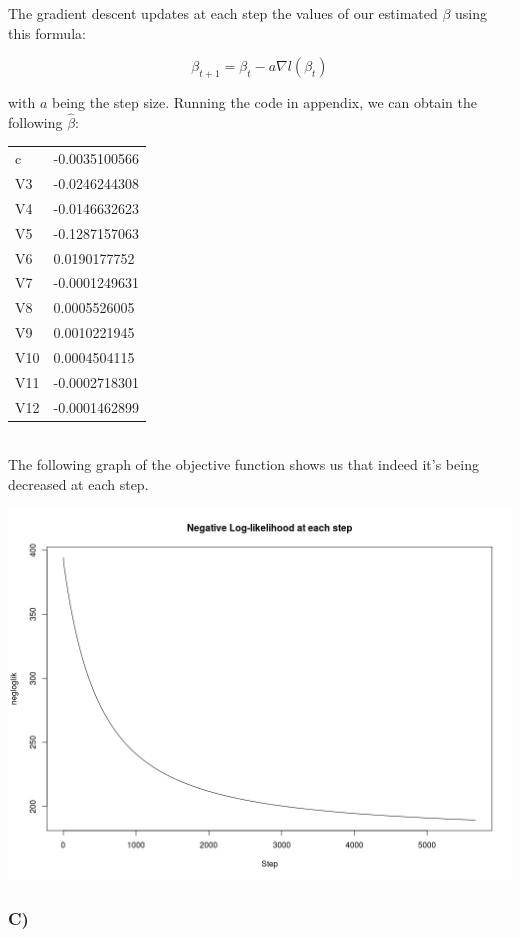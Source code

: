 \documentclass{article}
\begin{document}
The gradient descent updates at each step the values of our estimated $\beta$ using this formula:

\begin{equation*}
\beta_{t+1}=\beta_t-a\nabla l(\beta_t)
\end{equation*}

with $a$ being the step size. Running the code in appendix, we can obtain the following $\hat{\beta}$:\\

\begin{tabular}{ll}
c		    &-0.0035100566\\
V3          &-0.0246244308\\
V4          &-0.0146632623\\
V5          &-0.1287157063\\
V6          & 0.0190177752\\
V7          &-0.0001249631\\
V8          & 0.0005526005\\
V9          & 0.0010221945\\
V10         & 0.0004504115\\
V11         &-0.0002718301\\
V12         &-0.0001462899
\end{tabular}\\

The following graph of the objective function shows us that indeed it's being decreased at each step.

\includegraphics[width=\textwidth]{Rplot_gradient.png}

\subsubsection*{C)}
\end{document}
